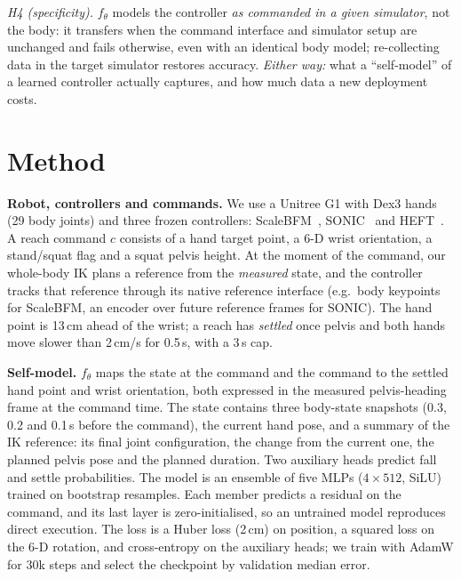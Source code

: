 \documentclass[conference]{IEEEtran}
\begin{document}
\emph{H4 (specificity).} $f_\theta$ models the controller \emph{as commanded in a given simulator}, not the body: it transfers when the command interface and simulator setup are unchanged and fails otherwise, even with an identical body model; re-collecting data in the target simulator restores accuracy. \emph{Either way:} what a ``self-model'' of a learned controller actually captures, and how much data a new deployment costs.

\section{Method}\label{sec:method}
\textbf{Robot, controllers and commands.} We use a Unitree G1 with Dex3 hands (29 body joints) and three frozen controllers: ScaleBFM~\cite{scalebfm}, SONIC~\cite{sonic} and HEFT~\cite{heft}. A reach command $c$ consists of a hand target point, a 6-D wrist orientation, a stand/squat flag and a squat pelvis height. At the moment of the command, our whole-body IK plans a reference from the \emph{measured} state, and the controller tracks that reference through its native reference interface (e.g.\ body keypoints for ScaleBFM, an encoder over future reference frames for SONIC).
The hand point is 13\,cm ahead of the wrist; a reach has \emph{settled} once pelvis and both hands move slower than 2\,cm/s for 0.5\,s, with a 3\,s cap.

\textbf{Self-model.} $f_\theta$ maps the state at the command and the command to the settled hand point and wrist orientation, both expressed in the measured pelvis-heading frame at the command time. The state contains three body-state snapshots (0.3, 0.2 and 0.1\,s before the command), the current hand pose, and a summary of the IK reference: its final joint configuration, the change from the current one, the planned pelvis pose and the planned duration. Two auxiliary heads predict fall and settle probabilities. The model is an ensemble of five MLPs ($4\times512$, SiLU) trained on bootstrap resamples. Each member predicts a residual on the command, and its last layer is zero-initialised, so an untrained model reproduces direct execution. The loss is a Huber loss (2\,cm) on position, a squared loss on the 6-D rotation, and cross-entropy on the auxiliary heads; we train with AdamW for 30k steps and select the checkpoint by validation median error.
\end{document}
